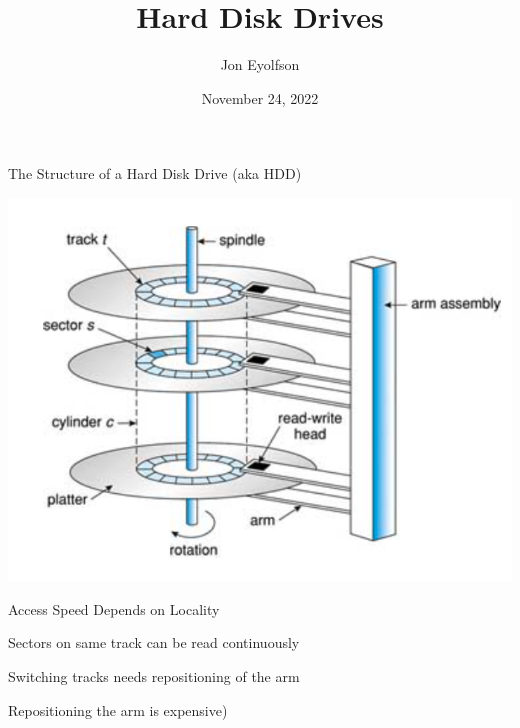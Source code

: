 

\title{Hard Disk Drives}
\author{Jon Eyolfson}
\date{November 24, 2022}


  \begin{frame}
    \titlepage
  \end{frame}

  \begin{frame}{The Structure of a Hard Disk Drive (aka HDD)}
    \begin{center}
        \includegraphics[height=0.8\textheight]{hdd1.png}
    \end{center}
  \end{frame}

  \begin{frame}{Access Speed Depends on Locality}

    Sectors on same track can be read continuously

    \vspace{2em}

    Switching tracks needs repositioning of the arm

    \hspace{2em} Repositioning the arm is expensive)
  \end{frame}


